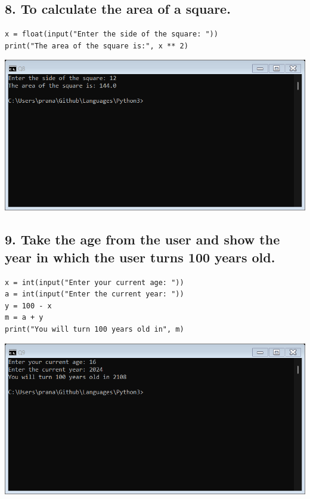 \documentclass[12pt]{article}
\begin{document}
\subsection*{8. To calculate the area of a square.}
\begin{verbatim}
x = float(input("Enter the side of the square: "))
print("The area of the square is:", x ** 2)
\end{verbatim}
\includegraphics[width=\linewidth]{images/8.png}

\subsection*{9. Take the age from the user and show the year in which the user turns 100 years old.}
\begin{verbatim}
x = int(input("Enter your current age: "))
a = int(input("Enter the current year: "))
y = 100 - x
m = a + y
print("You will turn 100 years old in", m)
\end{verbatim}
\includegraphics[width=\linewidth]{images/9.png}
\end{document}
